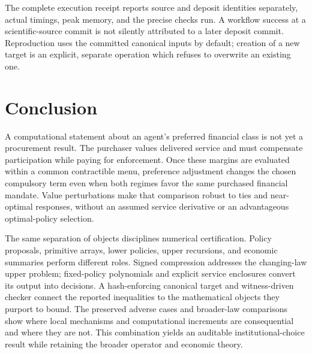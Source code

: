 The complete execution receipt reports source and deposit identities separately, actual timings, peak memory, and the precise checks run. A workflow success at a scientific-source commit is not silently attributed to a later deposit commit. Reproduction uses the committed canonical inputs by default; creation of a new target is an explicit, separate operation which refuses to overwrite an existing one.

\section{Conclusion}
A computational statement about an agent's preferred financial class is not yet a procurement result. The purchaser values delivered service and must compensate participation while paying for enforcement. Once these margins are evaluated within a common contractible menu, preference adjustment changes the chosen compulsory term even when both regimes favor the same purchased financial mandate. Value perturbations make that comparison robust to ties and near-optimal responses, without an assumed service derivative or an advantageous optimal-policy selection.

The same separation of objects disciplines numerical certification. Policy proposals, primitive arrays, lower policies, upper recursions, and economic summaries perform different roles. Signed compression addresses the changing-law upper problem; fixed-policy polynomials and explicit service enclosures convert its output into decisions. A hash-enforcing canonical target and witness-driven checker connect the reported inequalities to the mathematical objects they purport to bound. The preserved adverse cases and broader-law comparisons show where local mechanisms and computational increments are consequential and where they are not. This combination yields an auditable institutional-choice result while retaining the broader operator and economic theory.
